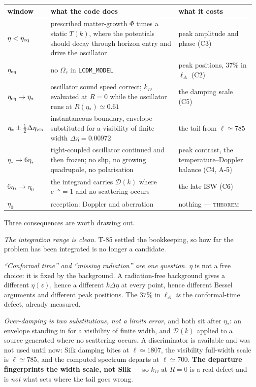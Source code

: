 \begin{center}\small
\begin{tabularx}{\textwidth}{@{}l >{\raggedright\arraybackslash}X >{\raggedright\arraybackslash}X@{}}
\toprule
\textbf{window} & \textbf{what the code does} & \textbf{what it costs} \\
\midrule
$\eta<\eta_{\rm eq}$ & prescribed matter-growth $\Phi$ times a static $T(k)$,
  where the potentials should decay through horizon entry and drive the
  oscillator & peak amplitude and phase (C3) \\
$\eta_{\rm eq}$ & no $\Omega_r$ in \texttt{LCDM\_MODEL} & peak positions,
  $37\%$ in $\ell_A$ (C2) \\
$\eta_{\rm eq}\to\eta_*$ & oscillator sound speed correct; $k_D$ evaluated at
  $R=0$ while the oscillator runs at $R(\eta_*)\simeq0.61$ & the damping scale
  (C5) \\
$\eta_*\pm\tfrac12\Delta\eta_{\rm vis}$ & instantaneous boundary, envelope
  substituted for a visibility of finite width $\Delta\eta=0.00972$ & the tail
  from $\ell\simeq785$ \\
$\eta_*\to6\eta_*$ & tight-coupled oscillator continued and then frozen; no
  slip, no growing quadrupole, no polarisation & peak contrast, the
  temperature--Doppler balance (C4, A-5) \\
$6\eta_*\to\eta_0$ & the integrand carries $\mathcal D(k)$ where
  $e^{-\kappa}=1$ and no scattering occurs & the late ISW (C6) \\
$\eta_0$ & reception: Doppler and aberration & nothing --- \textsc{theorem} \\
\bottomrule
\end{tabularx}
\end{center}

\noindent
Three consequences are worth drawing out.

\emph{The integration range is clean.} T-85 settled the bookkeeping, so how far
the problem has been integrated is no longer a candidate.

\emph{``Conformal time'' and ``missing radiation'' are one question.} $\eta$ is
not a free choice: it is fixed by the background. A radiation-free background
gives a different $\eta(z)$, hence a different $k\Delta\eta$ at every point,
hence different Bessel arguments and different peak positions. The $37\%$ in
$\ell_A$ \emph{is} the conformal-time defect, already measured.

\emph{Over-damping is two substitutions, not a limits error,} and both sit
after $\eta_*$: an envelope standing in for a visibility of finite width, and
$\mathcal D(k)$ applied to a source generated where no scattering occurs. A
discriminator is available and was not used until now: Silk damping bites at
$\ell\simeq1807$, the visibility full-width scale is $\ell\simeq785$, and the
computed spectrum departs at $\ell\simeq700$. \textbf{The departure fingerprints
the width scale, not Silk} --- so $k_D$ at $R=0$ is a real defect and is
\emph{not} what sets where the tail goes wrong.

